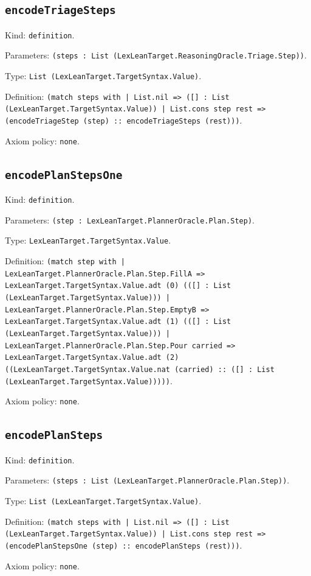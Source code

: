 \documentclass[11pt]{article}
\begin{document}
\subsection*{\texttt{encodeTriageSteps}}
\noindent Kind: \texttt{definition}.\par
\noindent Parameters: \texttt{(steps : List (LexLeanTarget.ReasoningOracle.Triage.Step))}.\par
\noindent Type: \texttt{List (LexLeanTarget.TargetSyntax.Value)}.\par
\noindent Definition: \texttt{(match steps with | List.nil => ([] : List (LexLeanTarget.TargetSyntax.Value)) | List.cons step rest => (encodeTriageStep (step) :: encodeTriageSteps (rest)))}.\par
\noindent Axiom policy: \texttt{none}.\par
\subsection*{\texttt{encodePlanStepsOne}}
\noindent Kind: \texttt{definition}.\par
\noindent Parameters: \texttt{(step : LexLeanTarget.PlannerOracle.Plan.Step)}.\par
\noindent Type: \texttt{LexLeanTarget.TargetSyntax.Value}.\par
\noindent Definition: \texttt{(match step with | LexLeanTarget.PlannerOracle.Plan.Step.FillA => LexLeanTarget.TargetSyntax.Value.adt (0) (([] : List (LexLeanTarget.TargetSyntax.Value))) | LexLeanTarget.PlannerOracle.Plan.Step.EmptyB => LexLeanTarget.TargetSyntax.Value.adt (1) (([] : List (LexLeanTarget.TargetSyntax.Value))) | LexLeanTarget.PlannerOracle.Plan.Step.Pour carried => LexLeanTarget.TargetSyntax.Value.adt (2) ((LexLeanTarget.TargetSyntax.Value.nat (carried) :: ([] : List (LexLeanTarget.TargetSyntax.Value)))))}.\par
\noindent Axiom policy: \texttt{none}.\par
\subsection*{\texttt{encodePlanSteps}}
\noindent Kind: \texttt{definition}.\par
\noindent Parameters: \texttt{(steps : List (LexLeanTarget.PlannerOracle.Plan.Step))}.\par
\noindent Type: \texttt{List (LexLeanTarget.TargetSyntax.Value)}.\par
\noindent Definition: \texttt{(match steps with | List.nil => ([] : List (LexLeanTarget.TargetSyntax.Value)) | List.cons step rest => (encodePlanStepsOne (step) :: encodePlanSteps (rest)))}.\par
\noindent Axiom policy: \texttt{none}.\par
\end{document}
